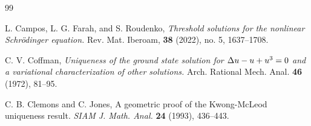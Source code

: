 \documentclass[12pt]{amsart}
\begin{document}
\begin{thebibliography}{99}

 L. Campos, L. G. Farah, and S. Roudenko, \emph{Threshold solutions for the nonlinear Schr\"odinger equation.} Rev. Mat. Iberoam, \textbf{38} (2022), no. 5, 1637--1708.



{ C. V. Coffman,} \emph{Uniqueness of the ground state solution
for $\Delta u-u+u\sp{3}=0$ and a variational characterization
of other solutions.}
{  Arch. Rational Mech. Anal.} {\bf 46} (1972), 81--95.

{\sc C. B. Clemons and C. Jones,}
A geometric proof of the Kwong-McLeod uniqueness result.
{\it SIAM J. Math. Anal.} {\bf 24} (1993),  436--443.







%





\end{thebibliography}
\end{document}
